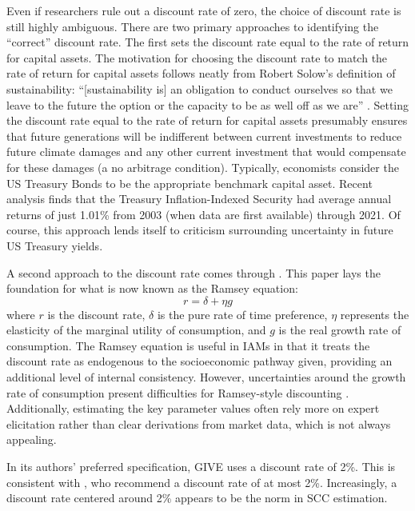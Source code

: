 Even if researchers rule out a discount rate of zero, the choice of discount rate is still highly ambiguous. There are two primary approaches to identifying the ``correct'' discount rate. The first sets the discount rate equal to the rate of return for capital assets. The motivation for choosing the discount rate to match the rate of return for capital assets follows neatly from Robert Solow's definition of sustainability: ``[sustainability is] an obligation to conduct ourselves so that we leave to the future the option or the capacity to be as well off as we are'' \citep{solow1991sustainability}. Setting the discount rate equal to the rate of return for capital assets presumably ensures that future generations will be indifferent between current investments to reduce future climate damages and any other current investment that would compensate for these damages (a no arbitrage condition). Typically, economists consider the US Treasury Bonds to be the appropriate benchmark capital asset. Recent analysis finds that the Treasury Inflation-Indexed Security had average annual returns of just 1.01\% from 2003 (when data are first available) through 2021. Of course, this approach lends itself to criticism surrounding uncertainty in future US Treasury yields. 

A second approach to the discount rate comes through \cite{ramsey1928mathematical}. This paper lays the foundation for what is now known as the Ramsey equation:
\begin{equation*}
	r = \delta + \eta g
\end{equation*}
where $r$ is the discount rate, $\delta$ is the pure rate of time preference, $\eta$ represents the elasticity of the marginal utility of consumption, and $g$ is the real growth rate of consumption. The Ramsey equation is useful in IAMs in that it treats the discount rate as endogenous to the socioeconomic pathway given, providing an additional level of internal consistency. However, uncertainties around the growth rate of consumption present difficulties for Ramsey-style discounting \citep{national2017valuing, newell2022discounting}. Additionally, estimating the key parameter values often rely more on expert elicitation rather than clear derivations from market data, which is not always appealing.

In its authors' preferred specification, GIVE uses a discount rate of 2\%. This is consistent with \cite{carleton2022guide}, who recommend a discount rate of at most 2\%. Increasingly, a discount rate centered around 2\% appears to be the norm in SCC estimation. 

